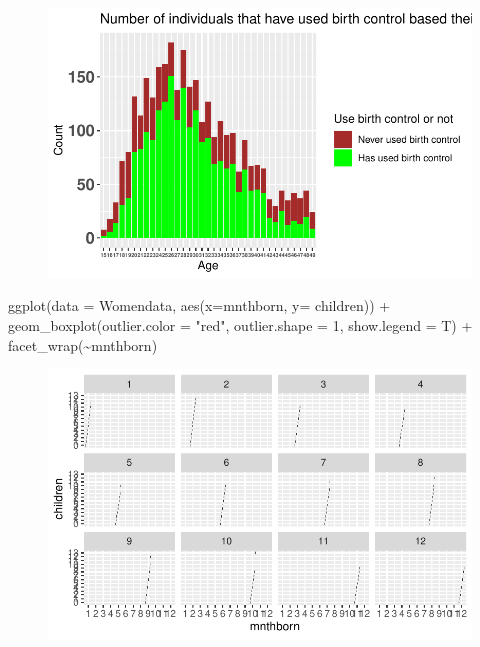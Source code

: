 \documentclass[
  letterpaper,
  DIV=11,
  numbers=noendperiod]{scrartcl}
\newenvironment{Shaded}{\begin{snugshade}}{\end{snugshade}}
\newcommand{\AttributeTok}[1]{\textcolor[rgb]{0.40,0.45,0.13}{#1}}
\newcommand{\DecValTok}[1]{\textcolor[rgb]{0.68,0.00,0.00}{#1}}
\newcommand{\FunctionTok}[1]{\textcolor[rgb]{0.28,0.35,0.67}{#1}}
\newcommand{\NormalTok}[1]{\textcolor[rgb]{0.00,0.23,0.31}{#1}}
\newcommand{\SpecialCharTok}[1]{\textcolor[rgb]{0.37,0.37,0.37}{#1}}
\newcommand{\StringTok}[1]{\textcolor[rgb]{0.13,0.47,0.30}{#1}}
\begin{document}
\begin{figure}[H]

{\centering \includegraphics{Fertility_Rates_Education_Impact_Botswana_files/figure-pdf/unnamed-chunk-27-1.pdf}

}

\end{figure}

\begin{Shaded}
\begin{Highlighting}[]
\FunctionTok{ggplot}\NormalTok{(}\AttributeTok{data =}\NormalTok{ Womendata, }\FunctionTok{aes}\NormalTok{(}\AttributeTok{x=}\NormalTok{mnthborn, }\AttributeTok{y=}\NormalTok{ children)) }\SpecialCharTok{+} 
  \FunctionTok{geom\_boxplot}\NormalTok{(}\AttributeTok{outlier.color =} \StringTok{"red"}\NormalTok{, }\AttributeTok{outlier.shape =} \DecValTok{1}\NormalTok{, }\AttributeTok{show.legend =}\NormalTok{ T) }\SpecialCharTok{+} 
  \FunctionTok{facet\_wrap}\NormalTok{(}\SpecialCharTok{\textasciitilde{}}\NormalTok{mnthborn)}
\end{Highlighting}
\end{Shaded}

\begin{figure}[H]

{\centering \includegraphics{Fertility_Rates_Education_Impact_Botswana_files/figure-pdf/unnamed-chunk-28-1.pdf}

}

\end{figure}
\end{document}
